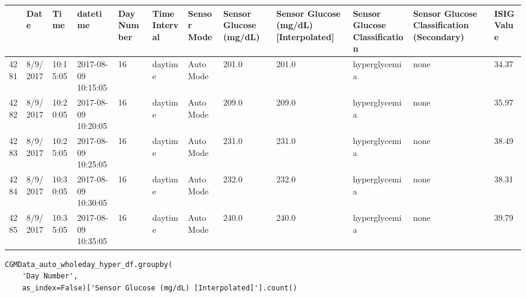 \bigskip\noindent
\begin{tabular}{p{}p{}p{}p{}p{}p{}p{}p{}p{}p{}p{}p{}}
\toprule
 & Date & Time & datetime & Day Number & Time Interval & Sensor Mode & Sensor Glucose (mg/dL) & Sensor Glucose (mg/dL) [Interpolated] & Sensor Glucose Classification & Sensor Glucose Classification (Secondary) & ISIG Value \\
\hline
4281 & 8/9/2017 & 10:15:05 & 2017-08-09 10:15:05 & 16 & daytime & Auto Mode & 201.0 & 201.0 & hyperglycemia & none & 34.37 \\
\hline
4282 & 8/9/2017 & 10:20:05 & 2017-08-09 10:20:05 & 16 & daytime & Auto Mode & 209.0 & 209.0 & hyperglycemia & none & 35.97 \\
\hline
4283 & 8/9/2017 & 10:25:05 & 2017-08-09 10:25:05 & 16 & daytime & Auto Mode & 231.0 & 231.0 & hyperglycemia & none & 38.49 \\
\hline
4284 & 8/9/2017 & 10:30:05 & 2017-08-09 10:30:05 & 16 & daytime & Auto Mode & 232.0 & 232.0 & hyperglycemia & none & 38.31 \\
\hline
4285 & 8/9/2017 & 10:35:05 & 2017-08-09 10:35:05 & 16 & daytime & Auto Mode & 240.0 & 240.0 & hyperglycemia & none & 39.79 \\
\hline
\bottomrule
\end{tabular}

\bigskip

\begin{verbatim}
CGMData_auto_wholeday_hyper_df.groupby(
    'Day Number',
    as_index=False)['Sensor Glucose (mg/dL) [Interpolated]'].count()
\end{verbatim}

